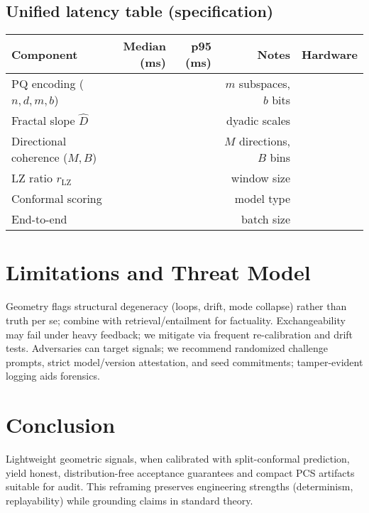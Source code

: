 \documentclass[11pt]{article}
\begin{document}
\subsection{Unified latency table (specification)}
\begin{center}
\begin{tabular}{lrrrr}
\toprule
Component & Median (ms) & p95 (ms) & Notes & Hardware \\
\midrule
PQ encoding ($n,d,m,b$) & & & $m$ subspaces, $b$ bits & \\
Fractal slope $\hat D$ & & & dyadic scales & \\
Directional coherence ($M,B$) & & & $M$ directions, $B$ bins & \\
LZ ratio $r_{\mathrm{LZ}}$ & & & window size & \\
Conformal scoring & & & model type & \\
\midrule
End-to-end & & & batch size & \\
\bottomrule
\end{tabular}
\end{center}

\section{Limitations and Threat Model}
Geometry flags structural degeneracy (loops, drift, mode collapse) rather than truth per se; combine with retrieval/entailment for factuality. Exchangeability may fail under heavy feedback; we mitigate via frequent re-calibration and drift tests. Adversaries can target signals; we recommend randomized challenge prompts, strict model/version attestation, and seed commitments; tamper-evident logging aids forensics.

\section{Conclusion}
Lightweight geometric signals, when calibrated with split-conformal prediction, yield honest, distribution-free acceptance guarantees and compact PCS artifacts suitable for audit. This reframing preserves engineering strengths (determinism, replayability) while grounding claims in standard theory.

\appendix
\end{document}
